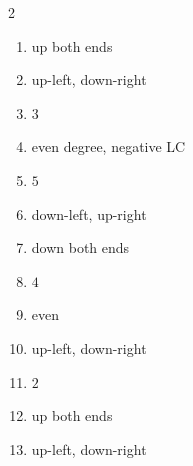 \documentclass[11pt]{article}
\begin{document}
\begin{keybox}
\begin{multicols}{2}
\small
\begin{enumerate}[leftmargin=*,itemsep=3pt]
  \item up both ends
  \item up-left, down-right
  \item $3$
  \item even degree, negative LC
  \item $5$
  \item down-left, up-right
  \item down both ends
  \item $4$
  \item even
  \item up-left, down-right
  \item $2$
  \item up both ends
  \item up-left, down-right
\end{enumerate}
\end{multicols}
\end{keybox}
\end{document}

